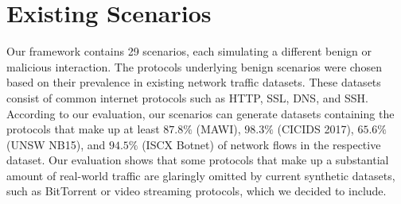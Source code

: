 \documentclass[runningheads]{llncs}
\begin{document}






 


\appendix


\section{Existing Scenarios}\label{Sec:ExistScen}

Our framework contains 29 scenarios, each simulating a different benign or malicious interaction. The protocols underlying benign scenarios were chosen based on their prevalence in existing network traffic datasets. %
These datasets consist of common internet protocols such as HTTP, SSL, DNS, and SSH. According to our evaluation, our scenarios can generate datasets containing the protocols that make up at least $87.8\%$ (MAWI), $98.3\%$ (CICIDS 2017), $65.6\%$ (UNSW NB15), and $94.5\%$ (ISCX Botnet) of network flows in the respective dataset.
Our evaluation shows that some protocols that make up a substantial amount of real-world traffic are glaringly omitted by current synthetic datasets, such as BitTorrent or video streaming protocols, which we decided to include. 
\end{document}
